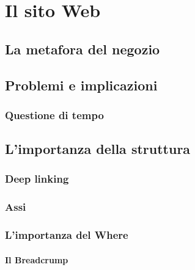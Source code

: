 
\section{Il sito Web}
	
	\subsection{La metafora del negozio}
	
	\subsection{Problemi e implicazioni}
	
		\subsubsection{Questione di tempo}	
	
	\subsection{L'importanza della struttura}
	
		\subsubsection{Deep linking}
		
		\subsubsection{Assi}
		
		\subsubsection{L'importanza del Where}
		
			\paragraph{Il Breadcrump}
			
				